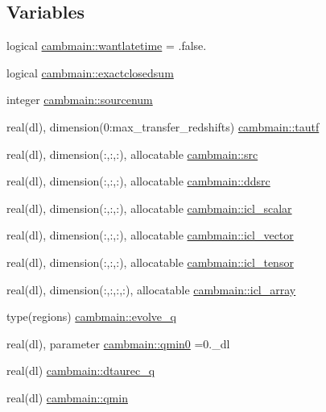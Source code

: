 \subsection*{Variables}
\begin{DoxyCompactItemize}
\item 
logical \mbox{\hyperlink{namespacecambmain_a2ce96c9fd586b264b5601a12a8903a31}{cambmain\+::wantlatetime}} = .false.
\item 
logical \mbox{\hyperlink{namespacecambmain_a2ded9daf3b231818ba6168f15ce0c90f}{cambmain\+::exactclosedsum}}
\item 
integer \mbox{\hyperlink{namespacecambmain_a7874020426cc2db0dd79451dce8e4476}{cambmain\+::sourcenum}}
\item 
real(dl), dimension(0\+:max\+\_\+transfer\+\_\+redshifts) \mbox{\hyperlink{namespacecambmain_a24c75595b15c8996bc6bc65a8bcf3cad}{cambmain\+::tautf}}
\item 
real(dl), dimension(\+:,\+:,\+:), allocatable \mbox{\hyperlink{namespacecambmain_a799546cf5b0652ca67395d086e02912a}{cambmain\+::src}}
\item 
real(dl), dimension(\+:,\+:,\+:), allocatable \mbox{\hyperlink{namespacecambmain_a3a07a99a808d7449c0ca61a9df448594}{cambmain\+::ddsrc}}
\item 
real(dl), dimension(\+:,\+:,\+:), allocatable \mbox{\hyperlink{namespacecambmain_ae6d811821c995ff2a5bda416a8696ae7}{cambmain\+::icl\+\_\+scalar}}
\item 
real(dl), dimension(\+:,\+:,\+:), allocatable \mbox{\hyperlink{namespacecambmain_a2044e91de72f6f3c0c0e2f87ab2c6a04}{cambmain\+::icl\+\_\+vector}}
\item 
real(dl), dimension(\+:,\+:,\+:), allocatable \mbox{\hyperlink{namespacecambmain_ad09fccee49c220454529f80e65beb489}{cambmain\+::icl\+\_\+tensor}}
\item 
real(dl), dimension(\+:,\+:,\+:,\+:), allocatable \mbox{\hyperlink{namespacecambmain_a34fbba5156bf16dc5e9131c1936bf47c}{cambmain\+::icl\+\_\+array}}
\item 
type(regions) \mbox{\hyperlink{namespacecambmain_a5ec3a97db7f68f99f47c3b077bbe3cda}{cambmain\+::evolve\+\_\+q}}
\item 
real(dl), parameter \mbox{\hyperlink{namespacecambmain_ac2494adca6c0269bd275ac6125de266c}{cambmain\+::qmin0}} =0.\+\_\+dl
\item 
real(dl) \mbox{\hyperlink{namespacecambmain_a0c8e31379dc1ff5e59d2da0bf1afcb8f}{cambmain\+::dtaurec\+\_\+q}}
\item 
real(dl) \mbox{\hyperlink{namespacecambmain_a5c0dcf87d7d21c1159e4eccad5b679ef}{cambmain\+::qmin}}

\end{DoxyCompactItemize}
